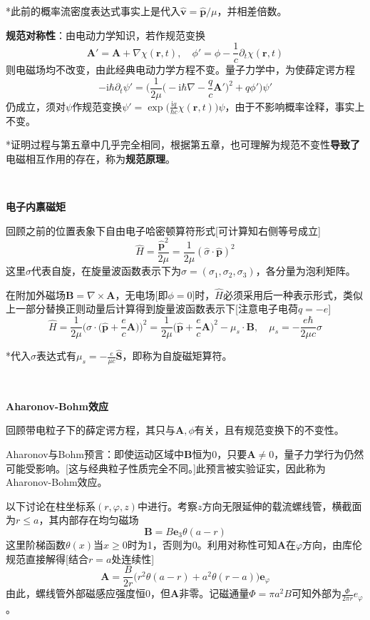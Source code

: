 \documentclass[a4paper,UTF8,fontset=windows]{ctexart}
\newcommand*{\ir}{\mathrm{i}}
\newcommand*{\br}{\mathbf{r}}
\newcommand*{\bp}{\mathbf{p}}
\newcommand*{\ba}{\mathbf{A}}
\begin{document}
*此前的概率流密度表达式事实上是代入$\hat{\mathbf{v}}=\hat{\bp}/\mu$，并相差倍数。

\textbf{规范对称性}：由电动力学知识，若作规范变换
$$\ba'=\ba+\nabla\chi(\br,t),\quad\phi'=\phi-\frac{1}{c}\partial_t\chi(\br,t)$$
则电磁场均不改变，由此经典电动力学方程不变。量子力学中，为使薛定谔方程
$$-\ir\hbar\partial_t\psi'=\bigg(\frac{1}{2\mu}\bigg(-\ir\hbar\nabla-\frac{q}{c}\ba'\bigg)^2+q\phi'\bigg)\psi'$$
仍成立，须对$\psi$作规范变换$\psi'=\exp\big(\frac{\ir q}{\hbar c}\chi(\br,t)\big)\psi$，由于不影响概率诠释，事实上不变。

*证明过程与第五章中几乎完全相同，根据第五章，也可理解为规范不变性\textbf{导致了}电磁相互作用的存在，称为\textbf{规范原理}。

\

\textbf{电子内禀磁矩}

回顾之前的位置表象下自由电子哈密顿算符形式[可计算知右侧等号成立]
$$\hat{H}=\frac{\hat{\bp}^2}{2\mu}=\frac{1}{2\mu}(\hat{\sigma}\cdot\hat{\bp})^2$$
这里$\hat{\sigma}$代表自旋，在旋量波函数表示下为$\sigma=(\sigma_1,\sigma_2,\sigma_3)$，各分量为泡利矩阵。

在附加外磁场$\mathbf{B}=\nabla\times\ba$，无电场[即$\phi=0$]时，$\hat{H}$必须采用后一种表示形式，类似上一部分替换正则动量后计算得到旋量波函数表示下[注意电子电荷$q=-e$]
$$\hat{H}=\frac{1}{2\mu}\bigg(\sigma\cdot\bigg(\hat{\bp}+\frac{e}{c}\ba\bigg)\bigg)^2=\frac{1}{2\mu}\bigg(\hat{\bp}+\frac{e}{c}\ba\bigg)^2-\mu_s\cdot\mathbf{B},\quad\mu_s=-\frac{e\hbar}{2\mu c}\sigma$$

*代入$\sigma$表达式有$\mu_s=-\frac{e}{\mu c}\hat{\mathbf{S}}$，即称为自旋磁矩算符。

\

\textbf{Aharonov-Bohm效应}

回顾带电粒子下的薛定谔方程，其只与$\ba,\phi$有关，且有规范变换下的不变性。

Aharonov与Bohm预言：即使运动区域中$\mathbf{B}$恒为0，只要$\mathbf{A}\ne0$，量子力学行为仍然可能受影响。[这与经典粒子性质完全不同。]此预言被实验证实，因此称为Aharonov-Bohm效应。

以下讨论在柱坐标系$(r,\varphi,z)$中进行。考察$z$方向无限延伸的载流螺线管，横截面为$r\le a$，其内部存在均匀磁场
$$\mathbf{B}=B\mathbf{e}_3\theta(a-r)$$
这里阶梯函数$\theta(x)$当$x\ge0$时为1，否则为0。利用对称性可知$\ba$在$\varphi$方向，由库伦规范直接解得[结合$r=a$处连续性]
$$\ba=\frac{B}{2r}\big(r^2\theta(a-r)+a^2\theta(r-a)\big)\mathbf{e}_\varphi$$
由此，螺线管外部磁感应强度恒0，但$\ba$非零。记磁通量$\Phi=\pi a^2B$可知外部为$\frac{\Phi}{2\pi r}e_\varphi$。
\end{document}
